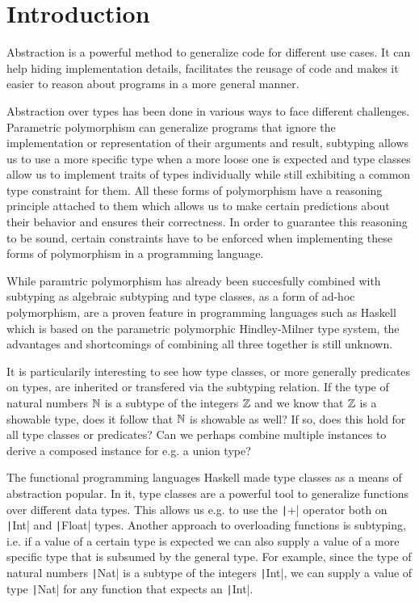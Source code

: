 
\chapter{Introduction}\label{ch:intro}

Abstraction is a powerful method to generalize code for different use cases.
It can help hiding implementation details, facilitates the reusage of code and makes it easier to reason about programs in a more general manner.

Abstraction over types has been done in various ways to face different challenges.
Parametric polymorphism can generalize programs that ignore the implementation or representation of their arguments and result,
subtyping allows us to use a more specific type when a more loose one is expected
and type classes allow us to implement traits of types individually while still exhibiting a common type constraint for them.
All these forms of polymorphism have a reasoning principle attached to them which allows us to make certain predictions about their behavior and ensures their correctness.
In order to guarantee this reasoning to be sound, certain constraints have to be enforced when implementing these forms of polymorphism in a programming language.

While paramtric polymorphism has already been succesfully combined with subtyping as algebraic subtyping \cite{dolan2017subtyping}
and type classes, as a form of ad-hoc polymorphism, are a proven feature in programming languages such as Haskell \cite{wadlerblott} which is based on the parametric polymorphic Hindley-Milner type system,
the advantages and shortcomings of combining all three together is still unknown.

It is particularily interesting to see how type classes, or more generally predicates on types, are inherited or transfered via the subtyping relation.
If the type of natural numbers $\mathbb{N}$ is a subtype of the integers $\mathbb{Z}$ and we know that $\mathbb{Z}$ is a showable type, does it follow that $\mathbb{N}$ is showable as well?
If so, does this hold for all type classes or predicates?
Can we perhaps combine multiple instances to derive a composed instance for e.g. a union type?

The functional programming languages Haskell made type classes as a means of abstraction popular.
In it, type classes are a powerful tool to generalize functions over different data types.
This allows us e.g. to use the \texttt|+| operator both on \texttt|Int| and \texttt|Float| types.
Another approach to overloading functions is subtyping, i.e. if a value of a certain type is expected we can also supply a value of a more specific type that is subsumed by the general type.
For example, since the type of natural numbers \texttt|Nat| is a subtype of the integers \texttt|Int|, we can supply a value of type \texttt|Nat| for any function that expects an \texttt|Int|.

